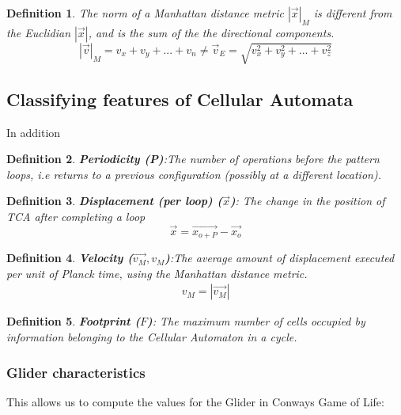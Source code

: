 \documentclass[notitlepage]{article}
\newtheorem{definition}{Definition}[section]
\begin{document}
\begin{appendices}
\begin{definition}
The norm of a Manhattan distance  metric $|\vec{x}|_M $ is different from the Euclidian $|\vec{x}|$, and is the sum of the the directional components.
\begin{equation}
|\vec{v}|_M = v_x + v_y +... + v_n \neq \vec{v}_E = \sqrt{v_x^2 +v_y^2 +... + v_z^2}
\end{equation}
\end{definition}

\subsection{Classifying features of Cellular Automata}

In addition 


\begin{definition}
\textbf{\textit{Periodicity} \textbf{(P)}}:The number of operations before the pattern loops, i.e returns to a previous configuration (possibly at a different location). 
\end{definition}

\begin{definition}
\textbf{\textit{Displacement (per loop)} \textbf{($\vec{x}$)}}: The change in the position of TCA after completing a loop
\begin{equation}
\vec{x} = \vec{x_{o+P}} - \vec{x_o}
\end{equation} 
\end{definition}



\begin{definition}
\textbf{\textit{Velocity}  \textbf{($\vec{v_M}, v_M$)}}:The average amount of displacement executed per unit of Planck time, using the Manhattan distance metric.
\begin{equation}
\begin{split}
v_M = |\vec{v_M}|
\end{split}
\end{equation} 
\end{definition}

\begin{definition}
\textbf{\textit{Footprint} \textbf{($ F $)}}: The maximum number of cells occupied by information belonging to the Cellular Automaton in a cycle.
\end{definition}

\subsubsection{Glider characteristics}
This allows us to compute the values for the Glider in Conways Game of Life:
\begin{center}


\end{center}
\end{appendices}
\end{document}
